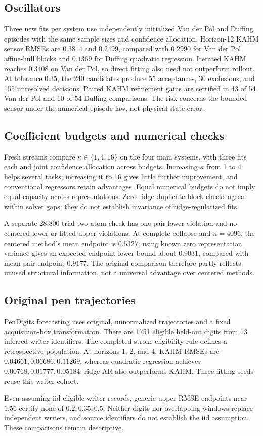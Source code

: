 \subsection{Oscillators}
\label{sec:oscillators}

Three new fits per system use independently initialized Van der Pol and
Duffing episodes with the same sample sizes and confidence allocation.
Horizon-12 KAHM sensor RMSEs are $0.3814$ and $0.2499$, compared with
$0.2990$ for Van der Pol affine-hull blocks and $0.1369$ for Duffing quadratic
regression. Iterated KAHM reaches $0.3408$ on Van der Pol, so direct fitting
also need not outperform rollout. At tolerance $0.35$, the 240 candidates
produce 55 acceptances, 30 exclusions, and 155 unresolved decisions. Paired
KAHM refinement gains are certified in 43 of 54 Van der Pol and 10 of 54
Duffing comparisons. The risk concerns the bounded sensor under the numerical
episode law, not physical-state error.

\subsection{Coefficient budgets and numerical checks}
\label{sec:budget-sensitivity}

Fresh streams compare $\kappa\in\{1,4,16\}$ on the four main systems, with
three fits each and joint confidence allocation across budgets. Increasing
$\kappa$ from 1 to 4 helps several tasks; increasing it to 16 gives little
further improvement, and conventional regressors retain advantages. Equal
numerical budgets do not imply equal capacity across representations.
Zero-ridge duplicate-block checks agree within solver gaps; they do not
establish invariance of ridge-regularized fits.

A separate 28,800-trial two-atom check has one pair-lower violation and no
centered-lower or fitted-upper violations. At complete collapse and $n=4096$,
the centered method's mean endpoint is $0.5327$; using known zero representation
variance gives an expected-endpoint lower bound about $0.9031$, compared with
mean pair endpoint $0.9177$. The original comparison therefore partly reflects
unused structural information, not a universal advantage over centered methods.

\subsection{Original pen trajectories}
\label{sec:pendigits}

PenDigits forecasting uses original, unnormalized trajectories and a fixed
acquisition-box transformation. There are 1751 eligible held-out digits from
13 inferred writer identifiers. The completed-stroke eligibility rule defines
a retrospective population. At horizons 1, 2, and 4, KAHM RMSEs are
$0.04661,0.06686,0.11269$, whereas quadratic regression achieves
$0.00768,0.01777,0.05184$; ridge AR also outperforms KAHM. Three fitting seeds
reuse this writer cohort.

Even assuming iid eligible writer records, generic upper-RMSE endpoints near
$1.56$ certify none of $0.2,0.35,0.5$. Neither digits nor overlapping windows
replace independent writers, and source identifiers do not establish the iid
assumption. These comparisons remain descriptive.
